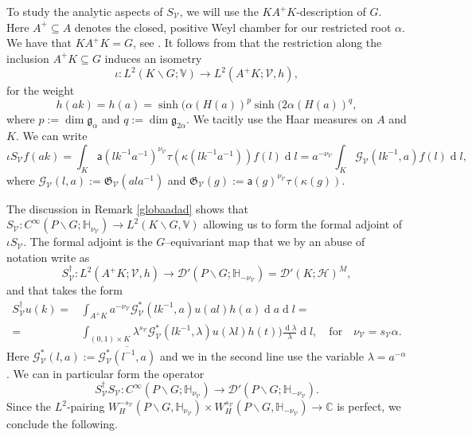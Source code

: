 \documentclass[a4paper,reqno]{amsart}
\numberwithin{equation}{section}
\def\dim{\operatorname{dim}}
\def\rd{\operatorname{d}\!}
\def\C{\mathbb{C}}
\theoremstyle{definition}
\theoremstyle{remark}
\begin{document}
To study the analytic aspects of $S_{\mathcal{V}}$, we will use the $KA^+K$-description of $G$. Here $A^+\subseteq A$ denotes the closed, positive Weyl chamber for our restricted root $\alpha$. We have that $KA^+K= G$, see \cite[Theorem 8.6, page 323]{HelgasonDGLGSS}. It follows from \cite[Proposition 5.28, page 141]{knappbook} that the restriction along the inclusion $A^+K\subseteq G$ induces an isometry
$$\iota:L^2(K\backslash G;\mathbb{V})\to L^2(A^+K;\mathcal{V}, h),$$
for the weight 
$$h(ak)=h(a)=\sinh(\alpha(H(a))^p\sinh(2\alpha(H(a))^{q},$$
where $p:=\dim\mathfrak{g}_\alpha$ and $q:=\dim\mathfrak{g}_{2\alpha}$. We tacitly use the Haar measures on $A$ and $K$. We can write 
\begin{equation}
\label{iotasgnu} 
\iota S_{\mathcal{V}} f(ak)=\int_K\mathsf{a}(lk^{-1}a^{-1})^{\nu_{\mathcal{V}}}\tau(\kappa(lk^{-1}a^{-1}))f(l)\rd l=a^{-\nu_{\mathcal{V}}} \int_K \mathcal{G}_{\mathcal{V}}(lk^{-1},a)f(l)\rd l,
\end{equation}
where $\mathcal{G}_\mathcal{V}(l,a):=\mathfrak{G}_\mathcal{V}(ala^{-1})$ and $\mathfrak{G}_{\mathcal{V}}(g):=\mathsf{a}(g)^{\nu_{\mathcal{V}}}\tau(\kappa(g))$.

The discussion in Remark \ref{globaadad} shows that $S_{\mathcal{V}}:C^\infty(P\backslash G;\mathbb{H}_{\nu_{\mathcal{V}}})\to L^2(K\backslash G,\mathbb{V})$ allowing us to form the formal adjoint of $\iota S_{\mathcal{V}}$. The formal adjoint is the $G$–equivariant map that we by an abuse of notation write as
$$S_{\mathcal{V}}^\dagger :L^2(A^+K;\mathcal{V}, h)\to \mathcal{D}'(P\backslash G;\mathbb{H}_{-\nu_{\mathcal{V}}})=\mathcal{D}'(K;\mathcal{H})^M,$$
and that takes the form
\begin{align}
\label{popskdpsdual}
S_{\mathcal{V}}^\dagger  u(k)=&\int_{A^+K}a^{-\nu_{\mathcal{V}}}\mathcal{G}_{\mathcal{V}}^*(lk^{-1},a)u(al)h(a)\rd a\rd l=\\
\nonumber
=&\int_{(0,1)\times K}\lambda^{s_{\mathcal{V}}}\mathcal{G}_{\mathcal{V}}^*(lk^{-1},\lambda)u(\lambda l)h(t))\frac{\rd \lambda}{\lambda}\rd l,\quad \mbox{for}\quad \nu_{\mathcal{V}}=s_{\mathcal{V}}\alpha.
\end{align}
Here $\mathcal{G}_{\mathcal{V}}^*(l,a):=\overline{\mathcal{G}_{\mathcal{V}}^*(l^{-1},a)}$ and we in the second line use the variable $\lambda=a^{-\alpha}$. We can in particular form the operator
$$
S_{\mathcal{V}}^\dagger  S_{\mathcal{V}}:C^\infty(P\backslash G;\mathbb{H}_{\nu_{\mathcal{V}}})\to \mathcal{D}'(P\backslash G;\mathbb{H}_{-\nu_{\mathcal{V}}}).
$$
Since the $L^2$-pairing $W^{-s_\mathcal{V}}_H(P\backslash G,\mathbb{H}_{\nu_\mathcal{V}})\times W^{s_\mathcal{V}}_H(P\backslash G,\mathbb{H}_{-\nu_\mathcal{V}})\to \C$ is perfect, we conclude the following. 
\end{document}
